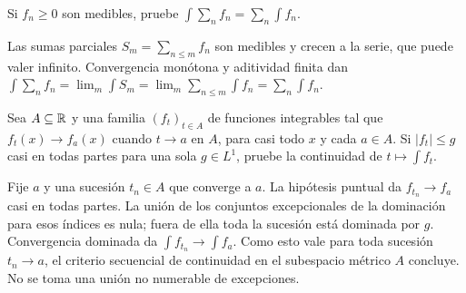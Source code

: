 \begin{ejercicio}\label{ej:v2-l10-1}
Si $f_n\ge0$ son medibles, pruebe $\int\sum_nf_n=\sum_n\int f_n$.
\end{ejercicio}
\begin{solucion}
Las sumas parciales $S_m=\sum_{n\le m}f_n$ son medibles y crecen a la serie, que puede valer infinito. Convergencia monótona y aditividad finita dan $\int\sum_nf_n=\lim_m\int S_m=\lim_m\sum_{n\le m}\int f_n=\sum_n\int f_n$.
\end{solucion}

\begin{ejercicio}\label{ej:v2-l10-2}
Sea $A\subseteq\mathbb R$ y una familia $(f_t)_{t\in A}$ de funciones integrables tal que $f_t(x)\to f_a(x)$ cuando $t\to a$ en $A$, para casi todo $x$ y cada $a\in A$. Si $|f_t|\le g$ casi en todas partes para una sola $g\in L^1$, pruebe la continuidad de $t\mapsto\int f_t$.
\end{ejercicio}
\begin{solucion}
Fije $a$ y una sucesión $t_n\in A$ que converge a $a$. La hipótesis puntual da $f_{t_n}\to f_a$ casi en todas partes. La unión de los conjuntos excepcionales de la dominación para esos índices es nula; fuera de ella toda la sucesión está dominada por $g$. Convergencia dominada da $\int f_{t_n}\to\int f_a$. Como esto vale para toda sucesión $t_n\to a$, el criterio secuencial de continuidad en el subespacio métrico $A$ concluye. No se toma una unión no numerable de excepciones.
\end{solucion}

